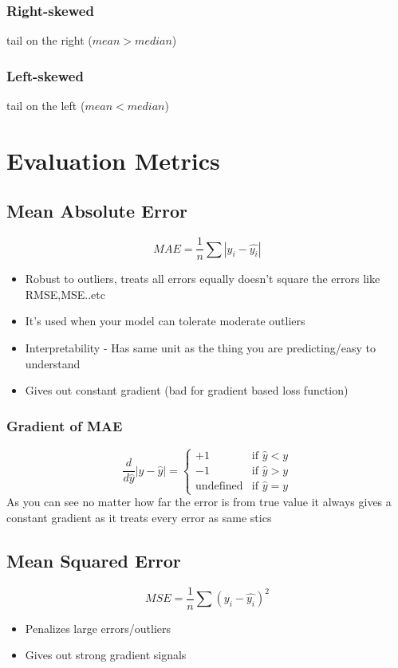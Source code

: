 \documentclass[12pt]{extarticle}
\begin{document}
\subsubsection{Right-skewed} 
tail on the right (\(mean > median\)) 

\subsubsection{Left-skewed}
tail on the left (\(mean < median\))

\section{Evaluation Metrics}

\subsection{Mean Absolute Error}  

$$MAE = \frac{1}{n}\sum{|y_i - \hat{y_i}|}$$ 
\begin{itemize}
    \item Robust to outliers, treats all errors equally doesn’t square the errors like RMSE,MSE..etc 
    \item It’s used when your model can tolerate moderate outliers  
    \item Interpretability - Has same unit as the thing you are predicting/easy to understand 
    \item Gives out constant gradient (bad for gradient based loss function) 
\end{itemize}
 
\subsubsection{Gradient of MAE} 
$$
\frac{d}{d\hat{y}}|y - \hat{y}| = 
\begin{cases} 
+1 & \text{if }  \hat{y} < y \\ 
-1 & \text{if }  \hat{y} > y \\ 
\text{undefined} & \text{if } \hat{y} = y 
\end{cases} 
$$
As you can see no matter how far the error is from true value it always gives a constant gradient as it treats every error as same
stics
\subsection{Mean Squared Error}
$$MSE = \frac{1}{n}\sum{(y_i - \hat{y_i})^2}$$ 
\begin{itemize}
    \item Penalizes large errors/outliers 
    \item Gives out strong gradient signals  
\end{itemize}
\end{document}
